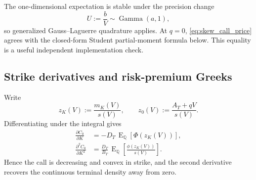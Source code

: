 \documentclass[11pt,a4paper]{article}
\DeclareMathOperator{\GammaDist}{Gamma}
\DeclareMathOperator{\E}{E}
\begin{document}
The one-dimensional expectation is stable under the precision change
\begin{equation}
  U:=\frac{b}{V}\sim\GammaDist(a,1),
  \label{eq:gamma_precision_quadrature}
\end{equation}
so generalized Gauss--Laguerre quadrature applies.  At $q=0$,
\eqref{eq:skew_call_price} agrees with the closed-form Student partial-moment
formula below.  This equality is a useful independent implementation check.

\subsection{Strike derivatives and risk-premium Greeks}

Write
\begin{equation}
  z_K(V):=\frac{m_K(V)}{s(V)},\qquad
  z_0(V):=\frac{A_T+qV}{s(V)}.
\end{equation}
Differentiating under the integral gives
\begin{align}
  \frac{\partial C_0}{\partial K}
  &=-D_T\,\E_{\mathbb Q}[\Phi(z_K(V))],
  \label{eq:skew_call_strike_delta}
  \\
  \frac{\partial^2 C_0}{\partial K^2}
  &=\frac{D_T}{B_T}\,
    \E_{\mathbb Q}\left[
      \frac{\phi(z_K(V))}{s(V)}
    \right].
  \label{eq:skew_call_strike_gamma}
\end{align}
Hence the call is decreasing and convex in strike, and the second derivative
recovers the continuous terminal density away from zero.
\end{document}
